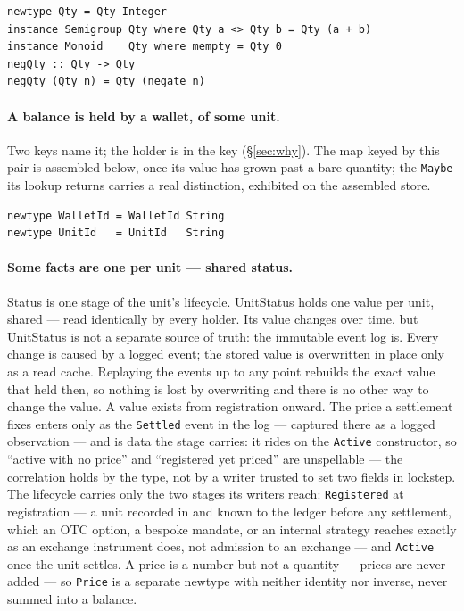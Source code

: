 \documentclass[11pt,a4paper]{article}
\begin{document}
\begin{lstlisting}
newtype Qty = Qty Integer
instance Semigroup Qty where Qty a <> Qty b = Qty (a + b)
instance Monoid    Qty where mempty = Qty 0
negQty :: Qty -> Qty
negQty (Qty n) = Qty (negate n)
\end{lstlisting}

\paragraph{A balance is held by a wallet, of some unit.}
Two keys name it; the holder is in the key (\S\ref{sec:why}). The map keyed by this
pair is assembled below, once its value has
grown past a bare quantity; the \texttt{Maybe} its lookup returns carries a real
distinction, exhibited on the assembled store.

\begin{lstlisting}
newtype WalletId = WalletId String
newtype UnitId   = UnitId   String
\end{lstlisting}

\paragraph{Some facts are one per unit --- shared status.}
Status is one stage of the unit's lifecycle. UnitStatus holds one value per unit,
shared --- read identically by every holder. Its value changes over time, but
UnitStatus is not a separate source of truth: the immutable event log is. Every change
is caused by a logged event; the stored value is overwritten in place only as a read
cache. Replaying the events up to any point rebuilds the exact value that held then, so
nothing is lost by overwriting and there is no other way to change the value. A value
exists from registration onward. The price a settlement fixes enters only as the
\texttt{Settled} event in the log --- captured there as a logged observation --- and is
data the stage carries: it rides
on the \texttt{Active} constructor, so ``active with no price'' and ``registered yet
priced'' are unspellable --- the correlation holds by the type, not by a writer
trusted to set two fields in lockstep. The lifecycle carries only the two stages its
writers reach: \texttt{Registered} at registration --- a unit recorded in and known to
the ledger before any settlement, which an OTC option, a bespoke mandate, or an internal
strategy reaches exactly as an exchange instrument does, not admission to an exchange ---
and \texttt{Active} once the unit
settles. A price is a number but not a quantity --- prices are never added --- so
\texttt{Price} is a separate newtype with neither identity nor inverse, never summed
into a balance.
\end{document}
